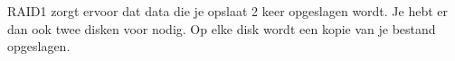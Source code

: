 RAID1 zorgt ervoor dat data die je opslaat 2 keer opgeslagen wordt. Je hebt er dan ook twee disken voor nodig. Op elke disk wordt een kopie van je bestand opgeslagen.
